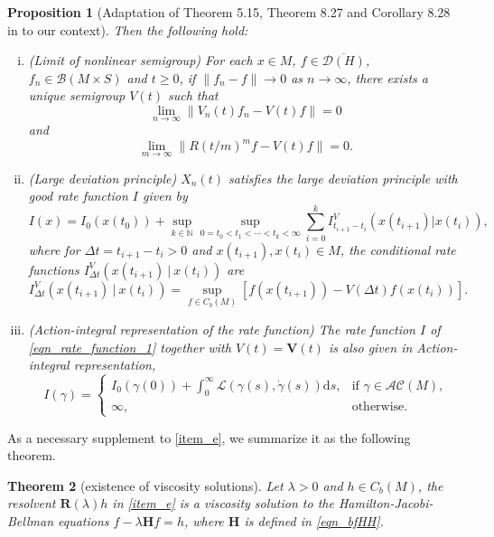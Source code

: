 \documentclass[a4paper]{article}
\numberwithin{equation}{section}
\newtheorem{theorem}{Theorem}[section]
\newtheorem{proposition}[theorem]{Proposition}
\theoremstyle{definition}
\begin{document}
\begin{proposition}[Adaptation of Theorem 5.15, Theorem 8.27 and Corollary 8.28 in \cite{FK2006} to our context]
		Then the following hold:
		\begin{enumerate}[(i)]
			\item \label{item_Limit of nonlinear semigroup} (Limit of nonlinear semigroup) For each $x\in M$, $f\in \overline{\mathcal{D}(H)}$, $f_n\in \mathcal{B}(M\times S)$ and $t\geq 0$, if $\|f_n-f\|\to 0$ as $n\to \infty$, there exists  a unique semigroup $V(t)$ such that  
\begin{equation}\label{nonlinear}
		\lim_{n\to\infty}\|V_n(t)f_n-V(t)f\|=0
			\end{equation}
		and 
  \begin{equation}\label{eqn_RV}
  \lim_{m\to\infty}\|R(t/m)^m f-V(t)f\|=0.
  \end{equation}
			\item \label{item_Large deviation principle}(Large deviation principle) $X_n(t)$ satisfies the large deviation principle with good rate function $I$ given by
			\begin{equation}\label{eqn_rate_function_1}
			I(x)=I_0(x(t_0))+\sup_{k\in \mathbb{N}}\sup_{0=t_0<t_1<\cdots<t_k<\infty}\sum_{i=0}^{k}I^V_{t_{i+1}-t_{i}}(x(t_{i+1})|x(t_{i})),
			\end{equation}
			where for $\Delta t=t_{i+1}-t_{i}>0$ and $x(t_{i+1}),x(t_{i})\in M$, the conditional rate functions $I^V_{\Delta t}(x(t_{i+1})~ |~ x(t_{i}))$ are 
			\begin{equation*}
				I^V_{\Delta t}(x(t_{i+1})~|~x(t_{i}))=\sup_{f\in C_b(M)}[f(x(t_{i+1}))-V(\Delta t)f(x(t_{i}))].
			\end{equation*} 
			\item \label{item_Action-integral representation of the rate function} (Action-integral representation of the rate function) 
  The rate function $I$ of \eqref{eqn_rate_function_1} together with $V(t)=\mathbf{V}(t)$ is also  given in Action-integral representation,
\begin{equation}\label{eqn_AC}
I(\gamma)=
\begin{cases}
I_0(\gamma(0))+\int^\infty_0\mathcal{L}(\gamma(s),\dot{\gamma}(s) )\text{d}s,&\mbox{if~$\gamma\in \mathcal{AC}(M)$,}\\
					\infty,&\mbox{otherwise.}
				\end{cases}
			\end{equation}
		\end{enumerate}
	\end{proposition}
As a necessary supplement to  \ref{item_e}, we summarize it as the following theorem.
\begin{theorem}[existence of viscosity solutions]\label{thm_viscosity_solution}
	Let $\lambda> 0$ and $h \in C_b(M)$, the resolvent $\mathbf{R}(\lambda)h$ in  \ref{item_e} is a viscosity solution to the Hamilton-Jacobi-Bellman equations $f-\lambda \mathbf{H}f=h$, where $\mathbf{H}$ is defined in \eqref{eqn_bfHH}.
\end{theorem}
\end{document}
